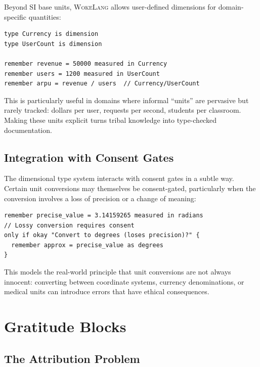 \documentclass[11pt,a4paper]{article}
\newcommand{\WokeLang}{\textsc{WokeLang}}
\begin{document}
Beyond SI base units, \WokeLang{} allows user-defined dimensions for
domain-specific quantities:

\begin{lstlisting}[caption={User-defined dimensions}]
type Currency is dimension
type UserCount is dimension

remember revenue = 50000 measured in Currency
remember users = 1200 measured in UserCount
remember arpu = revenue / users  // Currency/UserCount
\end{lstlisting}

This is particularly useful in domains where informal ``units'' are
pervasive but rarely tracked: dollars per user, requests per second,
students per classroom.  Making these units explicit turns tribal
knowledge into type-checked documentation.

\subsection{Integration with Consent Gates}

The dimensional type system interacts with consent gates in a subtle
way.  Certain unit conversions may themselves be consent-gated,
particularly when the conversion involves a loss of precision or a
change of meaning:

\begin{lstlisting}[caption={Consent-gated conversion}]
remember precise_value = 3.14159265 measured in radians
// Lossy conversion requires consent
only if okay "Convert to degrees (loses precision)?" {
  remember approx = precise_value as degrees
}
\end{lstlisting}

This models the real-world principle that unit conversions are not
always innocent: converting between coordinate systems, currency
denominations, or medical units can introduce errors that have ethical
consequences.

\section{Gratitude Blocks}
\label{sec:gratitude}

\subsection{The Attribution Problem}
\end{document}
